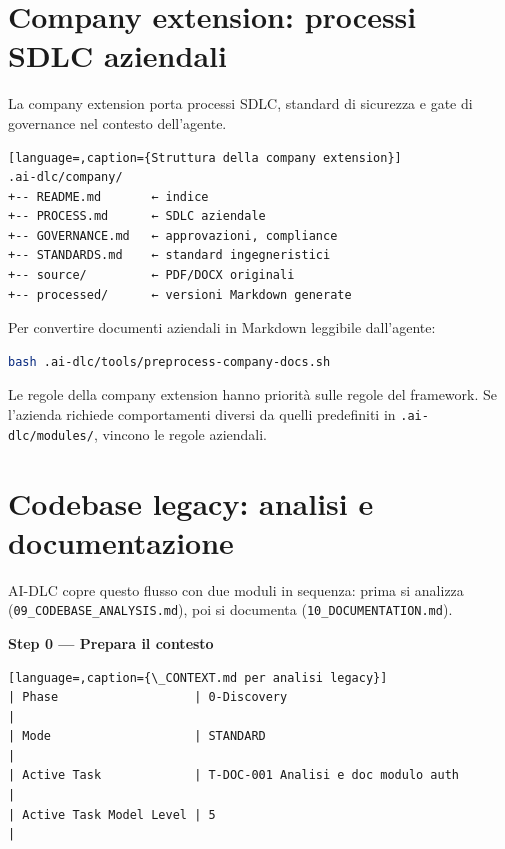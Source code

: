 \section{Company extension: processi SDLC aziendali}
\label{sec:15-company}

La company extension porta processi SDLC, standard di sicurezza e gate di governance nel contesto dell'agente.

\begin{lstlisting}[language=,caption={Struttura della company extension}]
.ai-dlc/company/
+-- README.md       ← indice
+-- PROCESS.md      ← SDLC aziendale
+-- GOVERNANCE.md   ← approvazioni, compliance
+-- STANDARDS.md    ← standard ingegneristici
+-- source/         ← PDF/DOCX originali
+-- processed/      ← versioni Markdown generate
\end{lstlisting}

Per convertire documenti aziendali in Markdown leggibile dall'agente:

\begin{lstlisting}[language=bash,caption={Preprocessing documenti aziendali}]
bash .ai-dlc/tools/preprocess-company-docs.sh
\end{lstlisting}

\begin{notebox}
Le regole della company extension hanno priorità sulle regole del framework. Se l'azienda richiede comportamenti diversi da quelli predefiniti in \texttt{.ai-dlc/modules/}, vincono le regole aziendali.
\end{notebox}

\section{Codebase legacy: analisi e documentazione}
\label{sec:15-legacy}

AI-DLC copre questo flusso con due moduli in sequenza: prima si analizza (\texttt{09\_CODEBASE\_ANALYSIS.md}), poi si documenta (\texttt{10\_DOCUMENTATION.md}).

\textbf{Step 0 --- Prepara il contesto}

\begin{lstlisting}[language=,caption={\_CONTEXT.md per analisi legacy}]
| Phase                   | 0-Discovery                               |
| Mode                    | STANDARD                                  |
| Active Task             | T-DOC-001 Analisi e doc modulo auth       |
| Active Task Model Level | 5                                         |
\end{lstlisting}

